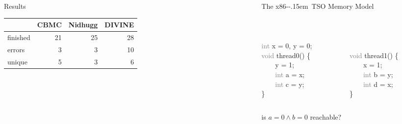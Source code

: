 \documentclass[final, 20pt, a0]{beamer}
\newlength{\sepwid}
\newlength{\onecolwid}
\newlength{\twocolwid}
\newcommand{\xtso}{\mbox{x86-\kern-.15em TSO}\xspace}
\begin{document}
\begin{frame}[t]
\begin{columns}[t]
\begin{column}{\onecolwid}
\begin{block}{Results}
\begingroup
\vspace{3ex}
\centering
\setlength\tabcolsep{0.5em} %
\renewcommand{\arraystretch}{1.1} %
\begin{tabular}{lrrr} \toprule
             & CBMC & Nidhugg & DIVINE \\ \midrule
    finished &   21 &      25 &     28 \\
    errors   &    3 &       3 &     10 \\
    unique   &    5 &       3 &      6 \\
    \bottomrule
\end{tabular}
\endgroup
\bigskip
\end{block}


\end{column} %

\begin{column}{\sepwid}\end{column} %

\begin{column}{\twocolwid} %

\begin{block}{The \xtso Memory Model}

    \begingroup
    \centering
    \begingroup
    \tt
    \begin{columns}
    \begin{column}{12cm}
    \textcolor{gray}{int} x = 0, y = 0; \\
    \textcolor{gray}{void} thread0() \{ \\
    \ \ \ \ y = 1; \\
    \ \ \ \ \textcolor{gray}{int} a = x; \\
    \ \ \ \ \textcolor{gray}{int} c = y; \\
    \}
    \end{column}
    \begin{column}{12cm}
    \mbox{}\\
    \textcolor{gray}{void} thread1() \{ \\
    \ \ \ \ x = 1; \\
    \ \ \ \ \textcolor{gray}{int} b = y; \\
    \ \ \ \ \textcolor{gray}{int} d = x; \\
    \}
    \end{column}
    \end{columns}\mbox{}
    \endgroup

    \noindent\medskip
    is $a = 0 \land b = 0$ reachable?\\[2ex]
    \endgroup


\end{block}
\end{column}
\end{columns}
\end{frame}
\end{document}
